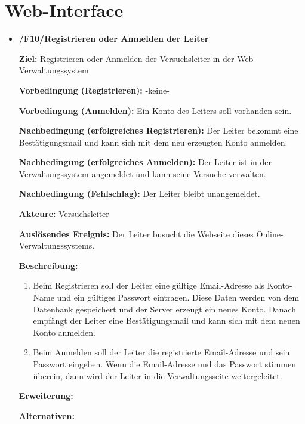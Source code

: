 \documentclass[a4paper]{scrreprt}
\begin{document}
        \section{Web-Interface}
            \begin{itemize}
                \item \textbf{/F10/Registrieren oder Anmelden der Leiter}

                    \par \textbf{Ziel: }Registrieren oder Anmelden der Versuchsleiter in der Web-Verwaltungssystem
                    \par \textbf{Vorbedingung (Registrieren): }-keine-
                    \par \textbf{Vorbedingung (Anmelden): }Ein Konto des Leiters soll vorhanden sein.
                    \par \textbf{Nachbedingung (erfolgreiches Registrieren): }Der Leiter bekommt eine Bestätigungsmail und kann sich mit dem neu erzeugten Konto anmelden.
                    \par \textbf{Nachbedingung (erfolgreiches Anmelden): }Der Leiter ist in der Verwaltungssystem angemeldet und kann seine Versuche verwalten.
                    \par \textbf{Nachbedingung (Fehlschlag): }Der Leiter bleibt unangemeldet.
                    \par \textbf{Akteure: }Versuchsleiter
                    \par \textbf{Auslösendes Ereignis: }Der Leiter busucht die Webseite dieses Online-Verwaltungssystems.
                    \par \textbf{Beschreibung: }
                        \begin{enumerate}
                            \item Beim Registrieren soll der Leiter eine gültige Email-Adresse als Konto-Name und ein gültiges Passwort eintragen. Diese Daten werden von dem Datenbank gespeichert und der Server erzeugt ein neues Konto. Danach empfängt der Leiter eine Bestätigungsmail und kann sich mit dem neuen Konto anmelden.
                            \item Beim Anmelden soll der Leiter die registrierte Email-Adresse und sein Passwort eingeben. Wenn die Email-Adresse und das Passwort stimmen überein, dann wird der Leiter in die Verwaltungsseite weitergeleitet.
                        \end{enumerate}
                    \par \textbf{Erweiterung: }
                    \par \textbf{Alternativen: }


\end{itemize}
\end{document}
